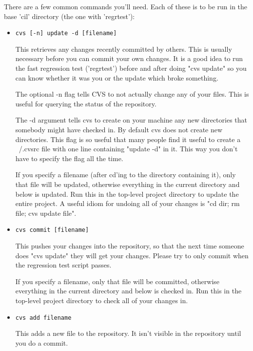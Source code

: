 \documentclass{book}
\def\t#1{{\tt #1}}
\begin{document}
There are a few common commands you'll need.  Each of these is to be run
in the base 'cil' directory (the one with 'regrtest'):

\begin{itemize}
\item \t{cvs [-n] update -d [filename]}

    This retrieves any changes recently committed by others.  This is
    usually necessary before you can commit your own changes.  It is a
    good idea to run the fast regression test ('regrtest') before and
    after doing "cvs update" so you can know whether it was you or the
    update which broke something.

    The optional -n flag tells CVS to not actually change any of your
    files.  This is useful for querying the status of the repository.

    The -d argument tells cvs to create on your machine any new directories
    that somebody might have checked in. By default cvs does not create new
    directories. This flag is so useful that many people find it useful to
    create a ~/.cvsrc file with one line containing "update -d" in it. This way
    you don't have to specify the flag all the time.

    If you specify a filename (after cd'ing to the directory containing it),
    only that file will be updated, otherwise everything in the current
    directory and below is updated. Run this in the top-level project
    directory to update the entire project. A useful idiom for undoing all of
    your changes is "cd dir; rm file; cvs update file".

    
\item \t{cvs commit [filename]}

    This pushes your changes into the repository, so that the next time
    someone does "cvs update" they will get your changes.  Please try to
    only commit when the regression test script passes.
    
    If you specify a filename, only that file will be committed, otherwise
    everything in the current directory and below is checked in. Run this in
    the top-level project directory to check all of your changes in.

\item  \t{cvs add filename}

    This adds a new file to the repository.  It isn't visible in the
    repository until you do a commit.
\end{itemize}
\end{document}
